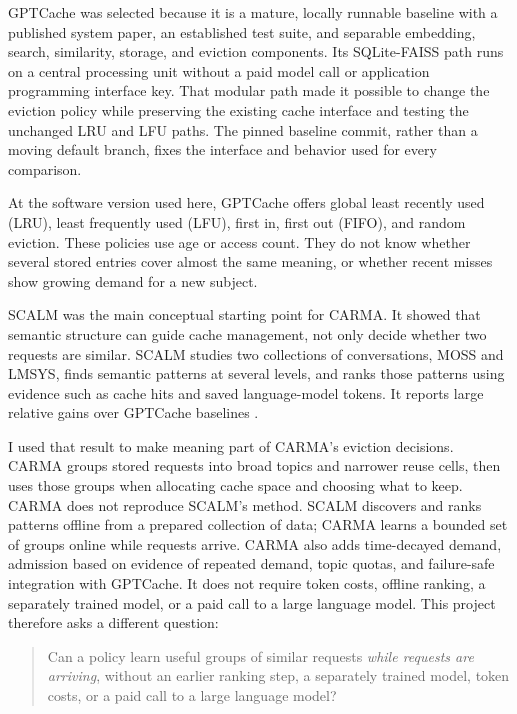 \documentclass[10pt,letterpaper]{article}
\begin{document}
GPTCache was selected because it is a mature, locally runnable baseline with a
published system paper, an established test suite, and separable embedding,
search, similarity, storage, and eviction components. Its SQLite-FAISS path
runs on a central processing unit without a paid model call or application
programming interface key. That modular path made it possible to change the
eviction policy while preserving the existing cache interface and testing the
unchanged LRU and LFU paths. The pinned baseline commit, rather than a moving
default branch, fixes the interface and behavior used for every comparison.

At the software version used here, GPTCache offers global least recently used
(LRU), least frequently used (LFU), first in, first out (FIFO), and random
eviction. These policies use age or access count. They do not know whether
several stored entries cover almost the same meaning, or whether recent misses
show growing demand for a new subject.

SCALM was the main conceptual starting point for CARMA. It showed that semantic
structure can guide cache management, not only decide whether two requests are
similar. SCALM studies two collections of conversations, MOSS and LMSYS, finds
semantic patterns at several levels, and ranks those patterns using evidence
such as cache hits and saved language-model tokens. It reports large relative
gains over GPTCache baselines \cite{scalm}.

I used that result to make meaning part of CARMA's eviction decisions. CARMA
groups stored requests into broad topics and narrower reuse cells, then uses
those groups when allocating cache space and choosing what to keep. CARMA does
not reproduce SCALM's method. SCALM discovers and ranks patterns offline from a
prepared collection of data; CARMA learns a bounded set of groups online while
requests arrive. CARMA also adds time-decayed demand, admission based on
evidence of repeated demand, topic quotas, and failure-safe integration with
GPTCache. It does not require token costs, offline ranking, a separately
trained model, or a paid call to a large language model. This project therefore
asks a different question:

\begin{quote}
Can a policy learn useful groups of similar requests \emph{while requests are
arriving}, without an earlier ranking step, a separately trained model, token
costs, or a paid call to a large language model?
\end{quote}
\end{document}
